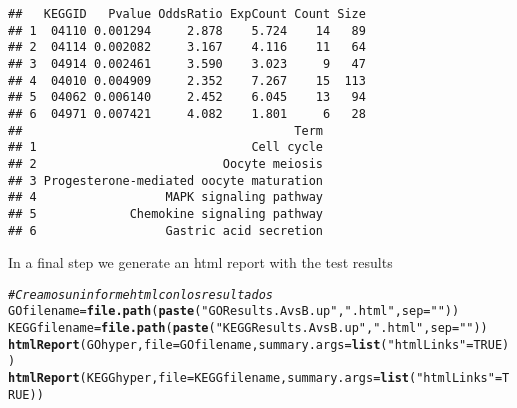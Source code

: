 \documentclass{article}\usepackage[]{graphicx}\usepackage[]{color}
\makeatletter
\newcommand{\hlnum}[1]{\textcolor[rgb]{0.686,0.059,0.569}{#1}}%
\newcommand{\hlstr}[1]{\textcolor[rgb]{0.192,0.494,0.8}{#1}}%
\newcommand{\hlcom}[1]{\textcolor[rgb]{0.678,0.584,0.686}{\textit{#1}}}%
\newcommand{\hlstd}[1]{\textcolor[rgb]{0.345,0.345,0.345}{#1}}%
\newcommand{\hlkwb}[1]{\textcolor[rgb]{0.69,0.353,0.396}{#1}}%
\newcommand{\hlkwc}[1]{\textcolor[rgb]{0.333,0.667,0.333}{#1}}%
\newcommand{\hlkwd}[1]{\textcolor[rgb]{0.737,0.353,0.396}{\textbf{#1}}}%
\newenvironment{kframe}{%
 \def\at@end@of@kframe{}%
 \ifinner\ifhmode%
  \def\at@end@of@kframe{\end{minipage}}%
  \begin{minipage}{\columnwidth}%
 \fi\fi%
 \def\FrameCommand##1{\hskip\@totalleftmargin \hskip-\fboxsep
 \colorbox{shadecolor}{##1}\hskip-\fboxsep
     \hskip-\linewidth \hskip-\@totalleftmargin \hskip\columnwidth}%
 \MakeFramed {\advance\hsize-\width
   \@totalleftmargin\z@ \linewidth\hsize
   \@setminipage}}%
 {\par\unskip\endMakeFramed%
 \at@end@of@kframe}
\newenvironment{knitrout}{}{} %
\makeatother
\begin{document}
\begin{knitrout}
\begin{kframe}
{\ttfamily\noindent\itshape\color{messagecolor}{\#\# \\\#\# KEGG.db contains mappings based on older data because the original\\\#\#\ \  resource was removed from the the public domain before the most\\\#\#\ \  recent update was produced. This package should now be considered\\\#\#\ \  deprecated and future versions of Bioconductor may not have it\\\#\#\ \  available.\ \ Users who want more current data are encouraged to look\\\#\#\ \  at the KEGGREST or reactome.db packages}}\begin{verbatim}
##   KEGGID   Pvalue OddsRatio ExpCount Count Size
## 1  04110 0.001294     2.878    5.724    14   89
## 2  04114 0.002082     3.167    4.116    11   64
## 3  04914 0.002461     3.590    3.023     9   47
## 4  04010 0.004909     2.352    7.267    15  113
## 5  04062 0.006140     2.452    6.045    13   94
## 6  04971 0.007421     4.082    1.801     6   28
##                                      Term
## 1                              Cell cycle
## 2                          Oocyte meiosis
## 3 Progesterone-mediated oocyte maturation
## 4                  MAPK signaling pathway
## 5             Chemokine signaling pathway
## 6                  Gastric acid secretion
\end{verbatim}
\end{kframe}
\end{knitrout}

In a final step we generate an html report with the test results

\begin{knitrout}
\color{fgcolor}\begin{kframe}
\begin{alltt}
\hlcom{# Creamos un informe html con los resultados}
\hlstd{GOfilename} \hlkwb{=}\hlkwd{file.path}\hlstd{(}\hlkwd{paste}\hlstd{(}\hlstr{"GOResults.AvsB.up"}\hlstd{,}\hlstr{".html"}\hlstd{,} \hlkwc{sep}\hlstd{=}\hlstr{""}\hlstd{))}
\hlstd{KEGGfilename} \hlkwb{=}\hlkwd{file.path}\hlstd{(}\hlkwd{paste}\hlstd{(}\hlstr{"KEGGResults.AvsB.up"}\hlstd{,}\hlstr{".html"}\hlstd{,} \hlkwc{sep}\hlstd{=}\hlstr{""}\hlstd{))}
\hlkwd{htmlReport}\hlstd{(GOhyper,} \hlkwc{file} \hlstd{= GOfilename,} \hlkwc{summary.args}\hlstd{=}\hlkwd{list}\hlstd{(}\hlstr{"htmlLinks"}\hlstd{=}\hlnum{TRUE}\hlstd{))}
\hlkwd{htmlReport}\hlstd{(KEGGhyper,} \hlkwc{file} \hlstd{= KEGGfilename,} \hlkwc{summary.args}\hlstd{=}\hlkwd{list}\hlstd{(}\hlstr{"htmlLinks"}\hlstd{=}\hlnum{TRUE}\hlstd{))}
\end{alltt}
\end{kframe}
\end{knitrout}
\end{document}
